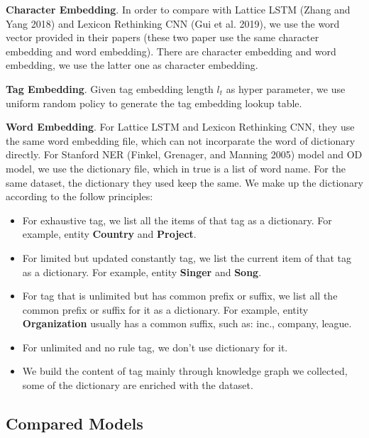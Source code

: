 \documentclass[letterpaper]{article} %
\begin{document}
\textbf{Character Embedding}. In order to compare with Lattice LSTM (Zhang and Yang 2018) and Lexicon Rethinking CNN (Gui et al. 2019), we use the word vector provided in their papers (these two paper use the same character embedding and word embedding). There are character embedding and word embedding, we use the latter one as character embedding.

\textbf{Tag Embedding}. Given tag embedding length $l_t$ as hyper parameter, we use uniform random policy to generate the tag embedding lookup table. 

\textbf{Word Embedding}. For Lattice LSTM and Lexicon Rethinking CNN, they use the same word embedding file, which can not incorparate the word of dictionary directly. For Stanford NER (Finkel, Grenager, and Manning 2005) model and OD model, we use the dictionary file, which in true is a list of word name. For the same dataset, the dictionary they used keep the same. We make up the dictionary according to the follow principles:

\begin{itemize}
\item For exhaustive tag, we list all the items of that tag as a dictionary. For example, entity \textbf{Country} and \textbf{Project}.
\item For limited but updated constantly tag, we list the current item of that tag as a dictionary. For example, entity \textbf{Singer} and \textbf{Song}.
\item For tag that is unlimited but has common prefix or suffix, we list all the common prefix or suffix for it as a dictionary. For example, entity \textbf{Organization} usually has a common suffix, such as: inc., company, league.
\item For unlimited and no rule tag, we don't use dictionary for it.
\item We build the content of tag mainly through knowledge graph we collected, some of the dictionary are enriched with the dataset.
\end{itemize}

\subsection{Compared Models}
\end{document}
